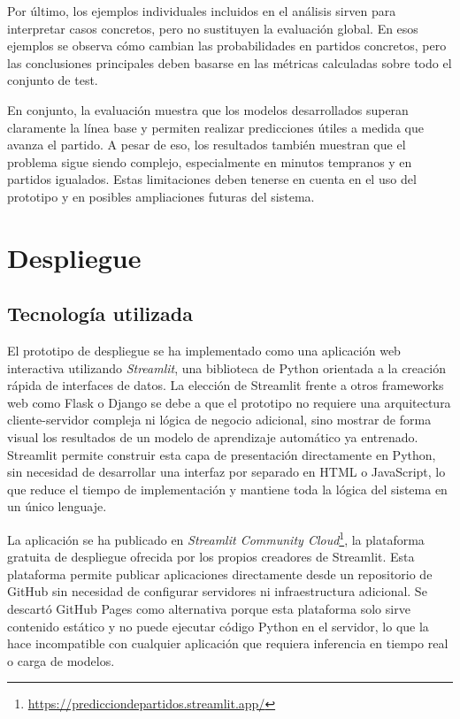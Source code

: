 Por último, los ejemplos individuales incluidos en el análisis sirven para interpretar casos concretos, pero no sustituyen la evaluación global. En esos ejemplos se observa cómo cambian las probabilidades en partidos concretos, pero las conclusiones principales deben basarse en las métricas calculadas sobre todo el conjunto de test.

En conjunto, la evaluación muestra que los modelos desarrollados superan claramente la línea base y permiten realizar predicciones útiles a medida que avanza el partido. A pesar de eso, los resultados también muestran que el problema sigue siendo complejo, especialmente en minutos tempranos y en partidos igualados. Estas limitaciones deben tenerse en cuenta en el uso del prototipo y en posibles ampliaciones futuras del sistema.

\section{Despliegue}

\subsection{Tecnología utilizada}

El prototipo de despliegue se ha implementado como una aplicación web interactiva utilizando \textit{Streamlit}, una biblioteca de Python orientada a la creación rápida de interfaces de datos. La elección de Streamlit frente a otros frameworks web como Flask o Django se debe a que el prototipo no requiere una arquitectura cliente-servidor compleja ni lógica de negocio adicional, sino mostrar de forma visual los resultados de un modelo de aprendizaje automático ya entrenado. Streamlit permite construir esta capa de presentación directamente en Python, sin necesidad de desarrollar una interfaz por separado en HTML o JavaScript, lo que reduce el tiempo de implementación y mantiene toda la lógica del sistema en un único lenguaje.

La aplicación se ha publicado en \textit{Streamlit Community Cloud}\footnote{\url{https://predicciondepartidos.streamlit.app/}}, la plataforma gratuita de despliegue ofrecida por los propios creadores de Streamlit. Esta plataforma permite publicar aplicaciones directamente desde un repositorio de GitHub sin necesidad de configurar servidores ni infraestructura adicional. Se descartó GitHub Pages como alternativa porque esta plataforma solo sirve contenido estático y no puede ejecutar código Python en el servidor, lo que la hace incompatible con cualquier aplicación que requiera inferencia en tiempo real o carga de modelos.

